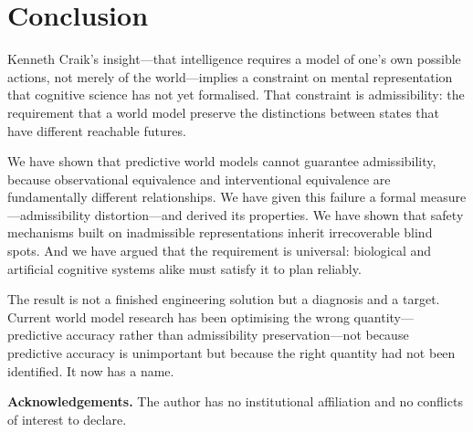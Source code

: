 \documentclass[11pt,a4paper]{article}
\begin{document}
\section{Conclusion}

Kenneth Craik's insight---that intelligence requires a model of one's own
possible actions, not merely of the world---implies a constraint on mental
representation that cognitive science has not yet formalised. That constraint
is admissibility: the requirement that a world model preserve the distinctions
between states that have different reachable futures.

We have shown that predictive world models cannot guarantee admissibility,
because observational equivalence and interventional equivalence are
fundamentally different relationships. We have given this failure a formal
measure---admissibility distortion---and derived its properties. We have shown
that safety mechanisms built on inadmissible representations inherit
irrecoverable blind spots. And we have argued that the requirement is universal:
biological and artificial cognitive systems alike must satisfy it to plan
reliably.

The result is not a finished engineering solution but a diagnosis and a target.
Current world model research has been optimising the wrong quantity---predictive
accuracy rather than admissibility preservation---not because predictive accuracy
is unimportant but because the right quantity had not been identified. It now has
a name.

\bigskip
\noindent\textbf{Acknowledgements.} The author has no institutional affiliation
and no conflicts of interest to declare.
\end{document}
